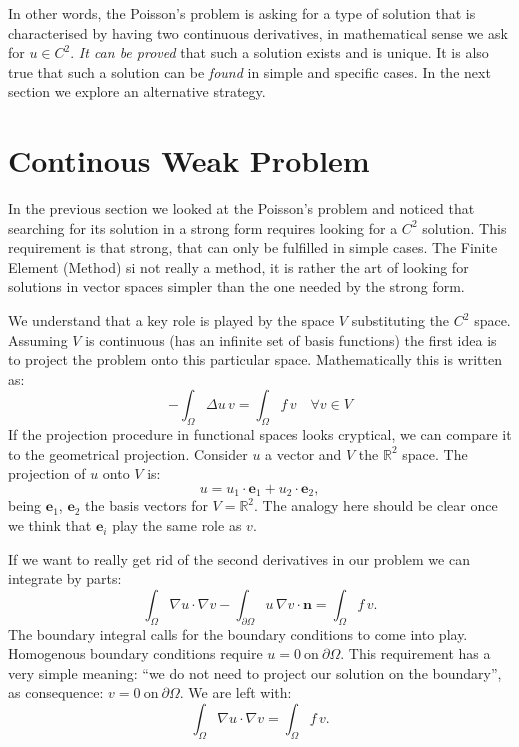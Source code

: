 \documentclass[11pt]{amsart}
\begin{document}
In other words, the Poisson's problem is asking for a type of solution 
that is characterised by having two continuous derivatives, in mathematical 
sense we ask for $u\in C^2$. \emph{It can be proved} that such a solution exists and 
is unique. It is also true that such a solution can be \emph{found} in simple and
specific cases. In the next section we explore an alternative strategy.

\section{Continous Weak Problem}
In the previous section we looked at the Poisson's problem and noticed that searching 
for its solution in a strong form requires looking for a $C^2$ solution. This requirement 
is that strong, that can only be fulfilled in simple cases. 
The Finite Element (Method) si not really a method, it is rather the art of looking 
for solutions in vector spaces simpler than the one needed by the strong form.

We understand that a key role is played by the space $V$ substituting 
the $C^2$ space. Assuming $V$ is continuous (has an infinite set of basis 
functions) the first idea is to project the problem onto this particular space. 
Mathematically this is written as:
\[
-\int_\Omega \Delta u\, v = \int_\Omega f\, v \quad \forall v \in V
\]
If the projection procedure in functional spaces looks cryptical,
we can compare it to the geometrical projection. Consider $u$ a vector 
and $V$ the $\mathbb{R}^2$ space. The projection of $u$ onto $V$ is:
\[
u = u_1 \cdot \mathbf{e}_1 + u_2 \cdot \mathbf{e}_2,
\]
being $\mathbf{e}_1$, $\mathbf{e}_2$ the basis vectors for $V = \mathbb{R}^2$.
The analogy here should be clear once we think that $\mathbf{e}_i$ play the 
same role as $v$.  

If we want to really get rid of the second derivatives in our problem we can 
integrate by parts:
\[
\int_\Omega \nabla u \cdot \nabla v - 
\int_{\partial \Omega} u \,\nabla v \cdot \mathbf{n} = \int_\Omega f\, v.
\]
The boundary integral calls for the boundary conditions to come into play. 
Homogenous boundary conditions require $u=0\ \mathrm{on}\ \partial\Omega$.
This requirement has a very simple meaning: ``we do not need to project our solution
on the boundary'', as consequence: $v=0\ \mathrm{on}\ \partial\Omega$.
We are left with:
\[
\int_\Omega \nabla u \cdot \nabla v = \int_\Omega f\, v.
\]
\end{document}

